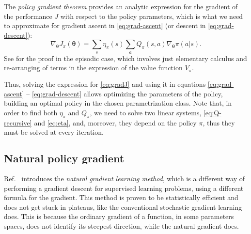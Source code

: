 The \emph{policy gradient theorem} provides an analytic expression for the gradient of the performance $J$ with respect to the policy parameters, which is what we need to approximate for gradient ascent in \eqref{eq:grad-ascent} (or descent in \eqref{eq:grad-descent}):
\begin{equation}
    \nabla_{\boldsymbol \theta} J_\pi(\boldsymbol \theta) = \sum_s \eta_\pi(s) \sum_a Q_\pi(s, a) \nabla_{\boldsymbol \theta} \pi(a|s).
    \label{eq:gradJ}
\end{equation}
See \cite{SuttonBarto} for the proof in the episodic case, which involves just elementary calculus and re-arranging of terms in the expression of the value function $V_\pi$. %

Thus, solving the expression for \eqref{eq:gradJ} and using it in equations \eqref{eq:grad-ascent} -- \eqref{eq:grad-descent} allows optimizing the parameters of the policy, building an optimal policy in the chosen parametrization class. Note that, in order to find both $\eta_\pi$ and $Q_\pi$, we need to solve two linear systems, \eqref{eq:Q-recursive} and \eqref{eq:eta}, and, moreover, they depend on the policy $\pi$, thus they must be solved at every iteration.


\subsection{Natural policy gradient}
\label{sec:npg}

Ref.~\cite{Amari1998} introduces the \emph{natural gradient learning method}, which is a different way of performing a gradient descent for supervised learning problems, using a different formula for the gradient. This method is proven to be statistically efficient and does not get stuck in plateaus, like the conventional stochastic gradient learning does. This is because the ordinary gradient of a function, in some parameters spaces, does not identify its steepest direction, while the natural gradient does.

